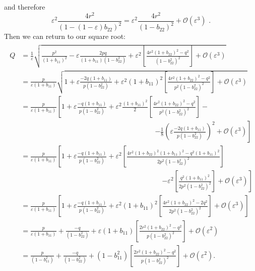 	and therefore
	\begin{equation}
		\varepsilon^2\frac{4r^2}{(1-(1-\varepsilon) b_{22})^2} = \varepsilon^2\frac{4r^2}{(1-b_{22})^2}+\mathcal{O}(\varepsilon^3) \,\, .
	\end{equation}
Then we can return to our square root:
{\small
	\begin{align}
	\begin{split}
		Q&= \frac{1}{\varepsilon}\sqrt{\frac{p^2}{(1+b_{11})^2}-\varepsilon\frac{2pq}{(1+b_{11})(1-b_{22}^2)}+\varepsilon^2\left[ \frac{4r^2(1+ b_{22})^2 -  q^2 }{(1-b_{22}^2)^2} \right] + \mathcal{O}(\varepsilon^3)}\\
		&= \frac{p}{\varepsilon (1+b_{11})} \sqrt{1+\varepsilon\frac{-2q(1+b_{11})}{p(1-b_{22}^2)}+\varepsilon^2(1+b_{11})^2\left[ \frac{4r^2(1+ b_{22})^2 -  q^2 }{p^2(1-b_{22}^2)^2} \right] + \mathcal{O}(\varepsilon^3)}\\
		&= \frac{p}{\varepsilon (1+b_{11})}\left[1+
		\varepsilon\frac{-q(1+b_{11})}{p(1-b_{22}^2)}+\varepsilon^2\frac{(1+b_{11})^2}{2}\left[ \frac{4r^2(1+ b_{22})^2 -  q^2 }{p^2(1-b_{22}^2)^2}\right] - 
		\right. \\
		& \qquad\qquad\qquad\qquad\qquad\qquad\qquad\qquad\qquad \quad \left.
		-\frac{1}{8}\left(\varepsilon\frac{-2q(1+b_{11})}{p(1-b_{22}^2)} \right)^2 + \mathcal{O}(\varepsilon^3)
		\right] \\
		&= \frac{p}{\varepsilon (1+b_{11})}\left[1+
		\varepsilon\frac{-q(1+b_{11})}{p(1-b_{22}^2)}+
		\varepsilon^2 \left[ \frac{4r^2(1+ b_{22})^2(1+b_{11})^2 -  q^2(1+b_{11})^2 }{2p^2(1-b_{22}^2)^2}\right] \right. \\
		&\qquad\qquad\qquad\qquad\qquad\qquad\qquad\qquad\qquad  \qquad\left.
		-\varepsilon^2\left[\frac{q^2(1+b_{11})^2}{2p^2(1-b_{22}^2)^2}\right]
		+ \mathcal{O}(\varepsilon^3)
		\right]\\
		&= \frac{p}{\varepsilon (1+b_{11})}\left[1+
		\varepsilon\frac{-q(1+b_{11})}{p(1-b_{22}^2)}+
		\varepsilon^2(1+b_{11})^2 \left[ \frac{4r^2(1+ b_{22})^2 -  2q^2 }{2p^2(1-b_{22}^2)^2}\right]
		+ \mathcal{O}(\varepsilon^3)
		\right]\\
		&=
		\frac{p}{\varepsilon (1+b_{11})} + 
		\frac{-q}{(1-b_{22}^2)}+
		\varepsilon(1+b_{11}) \left[ \frac{2r^2(1+ b_{22})^2 -  q^2 }{p(1-b_{22}^2)^2}\right]
		+ \mathcal{O}(\varepsilon^2)\\
		&=
		\frac{p}{(1-b_{11}^2)} + 
		\frac{-q}{(1-b_{22}^2)}+
		(1-b_{11}^2) \left[ \frac{2r^2(1+ b_{22})^2 -  q^2 }{p(1-b_{22}^2)^2}\right]
		+ \mathcal{O}(\varepsilon^2).
	\end{split}
	\end{align}
}

